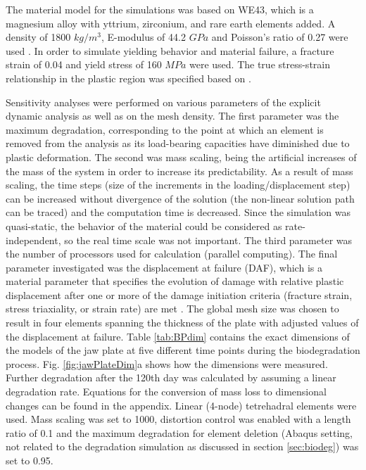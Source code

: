The material model for the simulations was based on WE43, which is a magnesium alloy with yttrium, zirconium, and rare earth elements added. A density of 1800 $kg/m^3$, E-modulus of 44.2 $GPa$ and Poisson's ratio of 0.27 were used \cite{Agarwal2016}. In order to simulate yielding behavior and material failure, a fracture strain of 0.04 and yield stress of 160 $MPa$ were used. The true stress-strain relationship in the plastic region was specified based on \cite{WE43}.

Sensitivity analyses were performed on various parameters of the explicit dynamic analysis as well as on the mesh density. The first parameter was the maximum degradation, corresponding to the point at which an element is removed from the analysis as its load-bearing capacities have diminished due to plastic deformation. The second was mass scaling, being the artificial increases of the mass of the system in order to increase its predictability. As a result of mass scaling, the time steps (size of the increments in the loading/displacement step) can be increased without divergence of the solution (the non-linear solution path can be traced) and the computation time is decreased. Since the simulation was quasi-static, the behavior of the material could be considered as rate-independent, so the real time scale was not important. The third parameter was the number of processors used for calculation (parallel computing). The final parameter investigated was the displacement at failure ({DAF}), which is a material parameter that specifies the evolution of damage with relative plastic displacement after one or more of the damage initiation criteria (fracture strain, stress triaxiality, or strain rate) are met \cite{daf,daf2}. The global mesh size was chosen to result in four elements spanning the thickness of the plate with adjusted values of the displacement at failure. Table \ref{tab:BPdim} contains the exact dimensions of the models of the jaw plate at five different time points during the biodegradation process. Fig. \ref{fig:jawPlateDim}a shows how the dimensions were measured. Further degradation after the 120th day was calculated by assuming a linear degradation rate. Equations for the conversion of mass loss to dimensional changes can be found in the appendix. Linear (4-node) tetrehadral elements were used. Mass scaling was set to 1000, distortion control was enabled with a length ratio of 0.1 and the maximum degradation for element deletion (Abaqus setting, not related to the degradation simulation as discussed in section \ref{sec:biodeg}) was set to 0.95.

